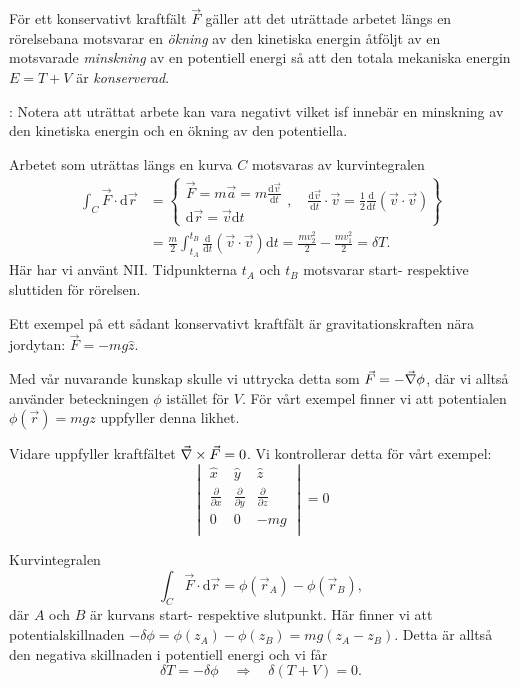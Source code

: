 \documentclass[%
oneside,                 %
final,                   %
10pt]{article}
\newcommand{\longinlinecomment}[3]{{\color{red}{\bf #1}: #2}}
\newenvironment{notice_mdfboxadmon}[1][]{
\begin{notice_mdfboxmdframed}[frametitle=#1]
}
{
\end{notice_mdfboxmdframed}
}
\begin{document}
\begin{notice_mdfboxadmon}

För ett konservativt kraftfält $\vec{F}$ gäller att det uträttade arbetet längs en rörelsebana motsvarar en \emph{ökning} av den kinetiska energin åtföljt av en motsvarade \emph{minskning} av en potentiell energi så att den totala mekaniska energin $E = T + V$ är \emph{konserverad}.

\longinlinecomment{Kommentar 1}{ Notera att uträttat arbete kan vara negativt vilket isf innebär en minskning av den kinetiska energin och en ökning av den potentiella. }{ Notera att uträttat arbete }

Arbetet som uträttas längs en kurva $C$ motsvaras av kurvintegralen
\begin{align}
\int_C \vec{F} \cdot \mbox{d}\vec{r} &= \left\{ \begin{array}{l}
\vec{F} = m \vec{a} = m \frac{\mbox{d}\vec{v}}{\mbox{d}t} \\
\mbox{d}\vec{r} = \vec{v} \mbox{d}t
\end{array} 
, \quad \frac{\mbox{d}\vec{v}}{\mbox{d}t} \cdot \vec{v} = \frac{1}{2}\frac{\mbox{d}}{\mbox{d}t} (\vec{v} \cdot \vec{v})
\right\} \\
&= \frac{m}{2} \int_{t_A}^{t_B} \frac{\mbox{d}}{\mbox{d}t} (\vec{v} \cdot \vec{v}) \mbox{d}t = \frac{m v_2^2}{2} - \frac{m v_1^2}{2} = \delta T.
\end{align}
Här har vi använt NII. Tidpunkterna $t_A$ och $t_B$ motsvarar start- respektive sluttiden för rörelsen.

Ett exempel på ett sådant konservativt kraftfält är gravitationskraften nära jordytan: $\vec{F} = - m g \hat{z}$.

Med vår nuvarande kunskap skulle vi uttrycka detta som $\vec{F} = -\vec{\nabla} \phi$, där vi alltså använder beteckningen $\phi$ istället för $V$. För vårt exempel finner vi att potentialen $\phi(\vec{r}) = m g z$ uppfyller denna likhet.

Vidare uppfyller kraftfältet $\vec{\nabla} \times \vec{F} = 0$. Vi kontrollerar detta för vårt exempel: 
$$
\begin{vmatrix}
\hat{x} & \hat{y} & \hat{z} \\
\frac{\partial}{\partial x} & \frac{\partial}{\partial y} & \frac{\partial}{\partial z} \\
\mbox{0}  &  \mbox{0}  & -mg \\
\end{vmatrix}
= 0
$$

Kurvintegralen
$$
\int_C \vec{F} \cdot \mbox{d}\vec{r} = \phi\left( \vec{r}_A \right) - \phi\left( \vec{r}_B \right),
$$
där $A$ och $B$ är kurvans start- respektive slutpunkt. Här finner vi att potentialskillnaden $-\delta \phi = \phi(z_A) - \phi(z_B) = mg (z_A-z_B)$. Detta är alltså den negativa skillnaden i potentiell energi och vi får
$$
\delta T = - \delta \phi \quad \Rightarrow \quad \delta(T+V) = 0.
$$
\end{notice_mdfboxadmon} %
\end{document}
